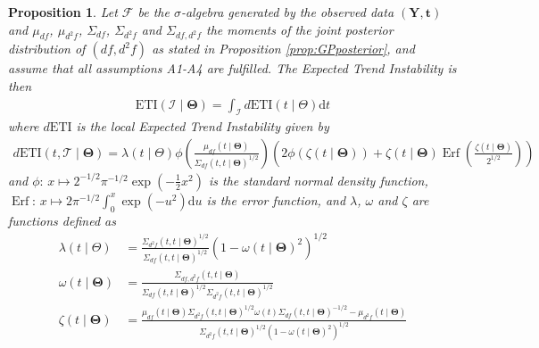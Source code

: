 \documentclass[
  11pt,
]{article}
\newtheorem{proposition}{Proposition}
\theoremstyle{nonumberplain}
\begin{document}
\begin{proposition}
Let $\mathcal{F}$ be the $\sigma$-algebra generated by the observed data $(\mathbf{Y}, \mathbf{t})$ and $\mu_{df}$, $\mu_{d^2\!f}$, $\Sigma_{df}$, $\Sigma_{d^2\!f}$ and $\Sigma_{df,d^2\!f}$ the moments of the joint posterior distribution of $(df, d^2\!f)$ as stated in Proposition \ref{prop:GPposterior}, and assume that all assumptions A1-A4 are fulfilled. The Expected Trend Instability is then
\begin{align*}
  \mathrm{ETI}(\mathcal{I} \mid \bm{\Theta}) = \int_{\mathcal{I}} d\mathrm{ETI}(t \mid \Theta)\mathrm{d}t
\end{align*}
where $d\mathrm{ETI}$ is the local Expected Trend Instability given by
\begin{align*}
d\mathrm{ETI}(t, \mathcal{T} \mid \bm{\Theta}) = \lambda(t \mid \Theta)\phi\left(\frac{\mu_{df}(t \mid \bm{\Theta})}{\Sigma_{df}(t,t \mid \bm{\Theta})^{1/2}}\right)\left(2\phi(\zeta(t\mid \bm{\Theta})) + \zeta(t\mid \bm{\Theta})\mathop{\mathrm{Erf}}\left(\frac{\zeta(t\mid \bm{\Theta}     )}{2^{1/2}}\right)\right)
\end{align*}
and $\phi\colon\, x \mapsto 2^{-1/2}\pi^{-1/2}\exp(-\frac{1}{2}x^2)$ is the standard normal density function, $\mathop{\mathrm{Erf}}\colon\, x \mapsto 2\pi^{-1/2}\int_0^x \exp(-u^2)\mathrm{d}u$ is the error function, and $\lambda$, $\omega$ and $\zeta$ are functions defined as
\begin{align*}
  \lambda(t \mid \Theta) &= \frac{\Sigma_{d^2\!f}(t,t \mid \bm{\Theta})^{1/2}}{\Sigma_{df}(t,t \mid \bm{\Theta})^{1/2}}\left(1-\omega(t \mid \bm{\Theta})^2\right)^{1/2}\\
  \omega(t \mid \bm{\Theta}) &= \frac{\Sigma_{df,d^2\!f}(t,t \mid \bm{\Theta})}{\Sigma_{df}(t,t \mid \bm{\Theta})^{1/2}\Sigma_{d^2\!f}(t,t \mid \bm{\Theta})^{1/2}}\\
  \zeta(t\mid \bm{\Theta}) &= \frac{\mu_{df}(t\mid \bm{\Theta})\Sigma_{d^2\!f}(t,t\mid \bm{\Theta})^{1/2}\omega(t)\Sigma_{df}(t,t\mid \bm{\Theta})^{-1/2} - \mu_{d^2\!f}(t\mid \bm{\Theta})}{\Sigma_{d^2\!f}(t,t\mid \bm{\Theta})^{1/2}\left(1 - \omega(t\mid \bm{\Theta})^2\right)^{1/2}}
\end{align*}
\label{prop:ETIposterior}
\end{proposition}
\end{document}
